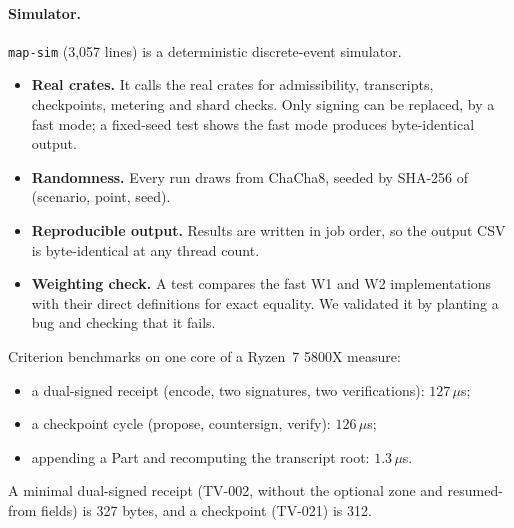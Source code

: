 \paragraph{Simulator.}
\texttt{map-sim} (3,057 lines) is a deterministic discrete-event
simulator.
\begin{itemize}
\item \textbf{Real crates.} It calls the real crates for admissibility,
  transcripts, checkpoints, metering and shard checks. Only signing can
  be replaced, by a fast mode; a fixed-seed test shows the fast mode
  produces byte-identical output.
\item \textbf{Randomness.} Every run draws from ChaCha8, seeded by
  SHA-256 of (scenario, point, seed).
\item \textbf{Reproducible output.} Results are written in job order, so
  the output CSV is byte-identical at any thread count.
\item \textbf{Weighting check.} A test compares the fast W1 and W2
  implementations with their direct definitions for exact equality. We
  validated it by planting a bug and checking that it fails.
\end{itemize}
Criterion benchmarks on one core of a Ryzen~7 5800X measure:
\begin{itemize}
\item a dual-signed receipt (encode, two signatures, two verifications):
  $127\,\mu$s;
\item a checkpoint cycle (propose, countersign, verify): $126\,\mu$s;
\item appending a Part and recomputing the transcript root:
  $1.3\,\mu$s.
\end{itemize}
A minimal dual-signed receipt (TV-002, without the optional zone and
resumed-from fields) is 327 bytes, and a checkpoint (TV-021) is 312.
